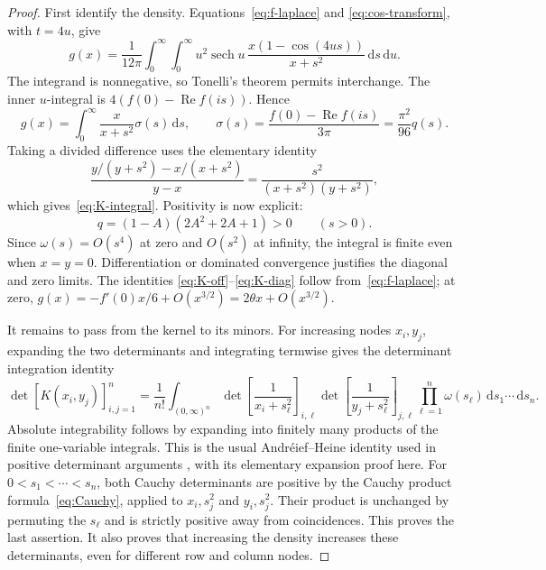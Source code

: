 \documentclass[11pt]{article}
\theoremstyle{definition}
\theoremstyle{remark}
\numberwithin{equation}{section}
\newcommand{\dd}{\,\mathrm d}
\DeclareMathOperator{\sech}{sech}
\DeclareMathOperator{\Ree}{Re}
\begin{document}
\begin{proof}
First identify the density. Equations~\eqref{eq:f-laplace} and
\eqref{eq:cos-transform}, with $t=4u$, give
\[
 g(x)=\frac1{12\pi}\int_0^\infty\int_0^\infty
 u^2\sech u\,\frac{x(1-\cos(4us))}{x+s^2}\dd s\dd u.
\]
The integrand is nonnegative, so Tonelli's theorem permits interchange.
The inner $u$-integral is $4(f(0)-\Ree f(is))$. Hence
\begin{equation}\label{eq:g-stieltjes}
 g(x)=\int_0^\infty\frac{x}{x+s^2}\sigma(s)\dd s,
 \qquad \sigma(s)=\frac{f(0)-\Ree f(is)}{3\pi}
                =\frac{\pi^2}{96}q(s).
\end{equation}
Taking a divided difference uses the elementary identity
\[
 \frac{y/(y+s^2)-x/(x+s^2)}{y-x}
       =\frac{s^2}{(x+s^2)(y+s^2)},
\]
which gives~\eqref{eq:K-integral}. Positivity is now explicit:
\begin{equation}\label{eq:q-positive}
 q=(1-A)(2A^2+2A+1)>0\qquad(s>0).
\end{equation}
Since $\omega(s)=O(s^4)$ at zero and $O(s^2)$ at infinity, the integral
is finite even when $x=y=0$. Differentiation or dominated convergence
justifies the diagonal and zero limits. The identities
\eqref{eq:K-off}--\eqref{eq:K-diag} follow from~\eqref{eq:f-laplace};
at zero, $g(x)=-f'(0)x/6+O(x^{3/2})=2\theta x+O(x^{3/2})$.

It remains to pass from the kernel to its minors. For increasing
nodes $x_i,y_j$, expanding the two determinants and
integrating termwise gives the determinant integration identity
\begin{equation}\label{eq:andreief}
 \det[K(x_i,y_j)]_{i,j=1}^n
 =\frac1{n!}\int_{(0,\infty)^n}
 \det\left[\frac1{x_i+s_\ell^2}\right]_{i,\ell}
 \det\left[\frac1{y_j+s_\ell^2}\right]_{j,\ell}
 \prod_{\ell=1}^n\omega(s_\ell)\dd s_1\cdots\dd s_n.
\end{equation}
Absolute integrability follows by expanding into finitely many products
of the finite one-variable integrals. This is the usual
Andr\'eief--Heine identity used in positive determinant arguments
\cite[Section~2]{Zudilin}, with its elementary expansion proof here.
For $0<s_1<\cdots<s_n$, both Cauchy determinants are positive by the
Cauchy product formula~\eqref{eq:Cauchy}, applied to $x_i,s_j^2$
and $y_i,s_j^2$. Their product is unchanged by permuting the
$s_\ell$ and is strictly positive away from coincidences. This proves
the last assertion. It also proves that increasing the density increases
these determinants, even for different row and column nodes.
\end{proof}
\end{document}
